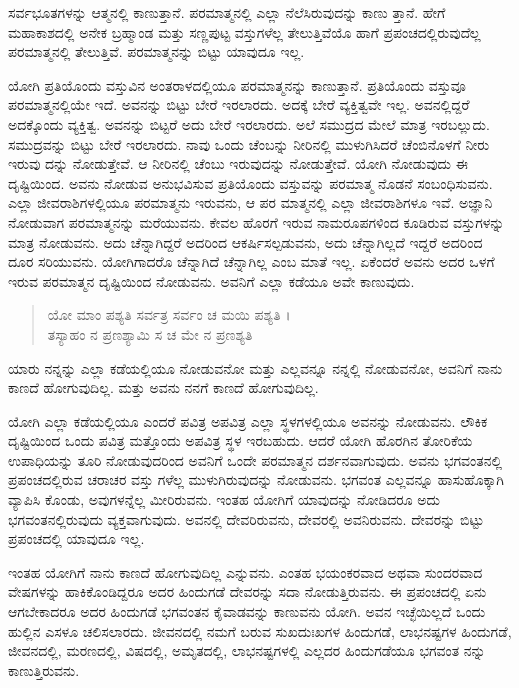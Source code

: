 ಸರ್ವಭೂತಗಳನ್ನು ಆತ್ಮನಲ್ಲಿ ಕಾಣುತ್ತಾನೆ. ಪರಮಾತ್ಮನಲ್ಲಿ ಎಲ್ಲಾ ನೆಲೆಸಿರುವುದನ್ನು ಕಾಣು ತ್ತಾನೆ. ಹೇಗೆ ಮಹಾಕಾಶದಲ್ಲಿ ಅನೇಕ ಬ್ರಹ್ಮಾಂಡ ಮತ್ತು ಸಣ್ಣಪುಟ್ಟ ವಸ್ತುಗಳೆಲ್ಲ ತೇಲುತ್ತಿವೆಯೊ ಹಾಗೆ ಪ್ರಪಂಚದಲ್ಲಿರುವುದೆಲ್ಲ ಪರಮಾತ್ಮನಲ್ಲಿ ತೇಲುತ್ತಿವೆ. ಪರಮಾತ್ಮನನ್ನು ಬಿಟ್ಟು ಯಾವುದೂ ಇಲ್ಲ.

ಯೋಗಿ ಪ್ರತಿಯೊಂದು ವಸ್ತುವಿನ ಅಂತರಾಳದಲ್ಲಿಯೂ ಪರಮಾತ್ಮನನ್ನು ಕಾಣುತ್ತಾನೆ. ಪ್ರತಿಯೊಂದು ವಸ್ತುವೂ ಪರಮಾತ್ಮನಲ್ಲಿಯೇ ಇದೆ. ಅವನನ್ನು ಬಿಟ್ಟು ಬೇರೆ ಇರಲಾರದು. ಅದಕ್ಕೆ ಬೇರೆ ವ್ಯಕ್ತಿತ್ವವೇ ಇಲ್ಲ. ಅವನಲ್ಲಿದ್ದರೆ ಅದಕ್ಕೊಂದು ವ್ಯಕ್ತಿತ್ವ. ಅವನನ್ನು ಬಿಟ್ಟರೆ ಅದು ಬೇರೆ ಇರಲಾರದು. ಅಲೆ ಸಮುದ್ರದ ಮೇಲೆ ಮಾತ್ರ ಇರಬಲ್ಲುದು. ಸಮುದ್ರವನ್ನು ಬಿಟ್ಟು ಬೇರೆ ಇರಲಾರದು. ನಾವು ಒಂದು ಚೆಂಬನ್ನು ನೀರಿನಲ್ಲಿ ಮುಳುಗಿಸಿದರೆ ಚೆಂಬಿನೊಳಗೆ ನೀರು ಇರುವು ದನ್ನು ನೋಡುತ್ತೇವೆ. ಆ ನೀರಿನಲ್ಲಿ ಚೆಂಬು ಇರುವುದನ್ನು ನೋಡುತ್ತೇವೆ. ಯೋಗಿ ನೋಡುವುದು ಈ ದೃಷ್ಟಿಯಿಂದ. ಅವನು ನೋಡುವ ಅನುಭವಿಸುವ ಪ್ರತಿಯೊಂದು ವಸ್ತುವನ್ನು ಪರಮಾತ್ಮ ನೊಡನೆ ಸಂಬಂಧಿಸುವನು. ಎಲ್ಲಾ ಜೀವರಾಶಿಗಳಲ್ಲಿಯೂ ಪರಮಾತ್ಮನು ಇರುವನು, ಆ ಪರ ಮಾತ್ಮನಲ್ಲಿ ಎಲ್ಲಾ ಜೀವರಾಶಿಗಳೂ ಇವೆ. ಅಜ್ಞಾನಿ ನೋಡುವಾಗ ಪರಮಾತ್ಮನನ್ನು ಮರೆಯುವನು. ಕೇವಲ ಹೊರಗೆ ಇರುವ ನಾಮರೂಪಗಳಿಂದ ಕೂಡಿರುವ ವಸ್ತುಗಳನ್ನು ಮಾತ್ರ ನೋಡುವನು. ಅದು ಚೆನ್ನಾಗಿದ್ದರೆ ಅದರಿಂದ ಆಕರ್ಷಿಸಲ್ಪಡುವನು, ಅದು ಚೆನ್ನಾಗಿಲ್ಲದೆ ಇದ್ದರೆ ಅದರಿಂದ ದೂರ ಸರಿಯುವನು. ಯೋಗಿಗಾದರೊ ಚೆನ್ನಾಗಿದೆ ಚೆನ್ನಾಗಿಲ್ಲ ಎಂಬ ಮಾತೆ ಇಲ್ಲ. ಏಕೆಂದರೆ ಅವನು ಅದರ ಒಳಗೆ ಇರುವ ಪರಮಾತ್ಮನ ದೃಷ್ಟಿಯಿಂದ ನೋಡುವನು. ಅವನಿಗೆ ಎಲ್ಲಾ ಕಡೆಯೂ ಅವೇ ಕಾಣುವುದು.

\begin{verse}
ಯೋ ಮಾಂ ಪಶ್ಯತಿ ಸರ್ವತ್ರ ಸರ್ವಂ ಚ ಮಯಿ ಪಶ್ಯತಿ ।\\ತಸ್ಯಾಹಂ ನ ಪ್ರಣಶ್ಯಾಮಿ ಸ ಚ ಮೇ ನ ಪ್ರಣಶ್ಯತಿ 
\end{verse}

{\small ಯಾರು ನನ್ನನ್ನು ಎಲ್ಲಾ ಕಡೆಯಲ್ಲಿಯೂ ನೋಡುವನೋ ಮತ್ತು ಎಲ್ಲವನ್ನೂ ನನ್ನಲ್ಲಿ ನೋಡುವನೋ, ಅವನಿಗೆ ನಾನು ಕಾಣದೆ ಹೋಗುವುದಿಲ್ಲ. ಮತ್ತು ಅವನು ನನಗೆ ಕಾಣದೆ ಹೋಗುವುದಿಲ್ಲ.}

ಯೋಗಿ ಎಲ್ಲಾ ಕಡೆಯಲ್ಲಿಯೂ ಎಂದರೆ ಪವಿತ್ರ ಅಪವಿತ್ರ ಎಲ್ಲಾ ಸ್ಥಳಗಳಲ್ಲಿಯೂ ಅವನನ್ನು ನೋಡುವನು. ಲೌಕಿಕ ದೃಷ್ಟಿಯಿಂದ ಒಂದು ಪವಿತ್ರ ಮತ್ತೊಂದು ಅಪವಿತ್ರ ಸ್ಥಳ ಇರಬಹುದು. ಆದರೆ ಯೋಗಿ ಹೊರಗಿನ ತೋರಿಕೆಯ ಉಪಾಧಿಯನ್ನು ತೂರಿ ನೋಡುವುದರಿಂದ ಅವನಿಗೆ ಒಂದೇ ಪರಮಾತ್ಮನ ದರ್ಶನವಾಗುವುದು. ಅವನು ಭಗವಂತನಲ್ಲಿ ಪ್ರಪಂಚದಲ್ಲಿರುವ ಚರಾಚರ ವಸ್ತು ಗಳೆಲ್ಲ ಮುಳುಗಿರುವುದನ್ನು ನೋಡುವನು. ಭಗವಂತ ಎಲ್ಲವನ್ನೂ ಹಾಸುಹೊಕ್ಕಾಗಿ ವ್ಯಾಪಿಸಿ ಕೊಂಡು, ಅವುಗಳನ್ನೆಲ್ಲ ಮೀರಿರುವನು. ಇಂತಹ ಯೋಗಿಗೆ ಯಾವುದನ್ನು ನೋಡಿದರೂ ಅದು ಭಗವಂತನಲ್ಲಿರುವುದು ವ್ಯಕ್ತವಾಗುವುದು. ಅವನಲ್ಲಿ ದೇವರಿರುವನು, ದೇವರಲ್ಲಿ ಅವನಿರುವನು. ದೇವರನ್ನು ಬಿಟ್ಟು ಪ್ರಪಂಚದಲ್ಲಿ ಯಾವುದೂ ಇಲ್ಲ.

ಇಂತಹ ಯೋಗಿಗೆ ನಾನು ಕಾಣದೆ ಹೋಗುವುದಿಲ್ಲ ಎನ್ನುವನು. ಎಂತಹ ಭಯಂಕರವಾದ ಅಥವಾ ಸುಂದರವಾದ ವೇಷಗಳನ್ನು ಹಾಕಿಕೊಂಡಿದ್ದರೂ ಅದರ ಹಿಂದುಗಡೆ ದೇವರನ್ನು ಸದಾ ನೋಡುತ್ತಿರುವನು. ಈ ಪ್ರಪಂಚದಲ್ಲಿ ಏನು ಆಗಬೇಕಾದರೂ ಅದರ ಹಿಂದುಗಡೆ ಭಗವಂತನ ಕೈವಾಡವನ್ನು ಕಾಣುವನು ಯೋಗಿ. ಅವನ ಇಚ್ಛೆಯಿಲ್ಲದೆ ಒಂದು ಹುಲ್ಲಿನ ಎಸಳೂ ಚಲಿಸಲಾರದು. ಜೀವನದಲ್ಲಿ ನಮಗೆ ಬರುವ ಸುಖದುಃಖಗಳ ಹಿಂದುಗಡೆ, ಲಾಭನಷ್ಟಗಳ ಹಿಂದುಗಡೆ, ಜೀವನದಲ್ಲಿ, ಮರಣದಲ್ಲಿ, ವಿಷದಲ್ಲಿ, ಅಮೃತದಲ್ಲಿ, ಲಾಭನಷ್ಟಗಳಲ್ಲಿ ಎಲ್ಲದರ ಹಿಂದುಗಡೆಯೂ ಭಗವಂತ ನನ್ನು ಕಾಣುತ್ತಿರುವನು.

